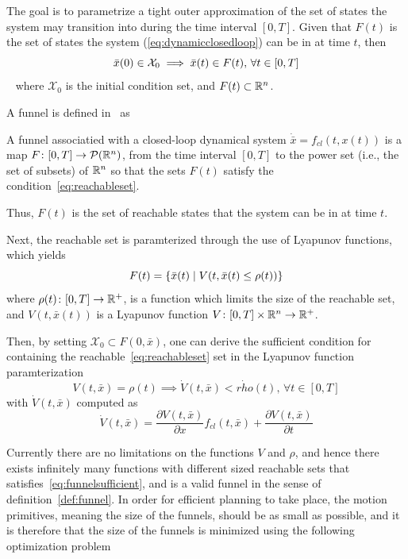 The goal is to parametrize a tight outer approximation of the set of states the
system may transition into during the time interval \([0,T]\). Given that
\(F(t)\) is the set of states the system (\ref{eq:dynamicclosedloop}) can be in
at time \(t\), then
\begin{equation}
  \label{eq:reachableset}
  \bar{x}(0) \in \mathcal{X}_0 \implies \bar{x}(t) \in F(t), \, \forall t \in [0,T]
\end{equation}~\cite{majumdarFunnelLibrariesRealtime2017} 
where \(\mathcal{X}_0\) is the initial condition set, and \(F(t) \subset \mathbb{R}^n\).

A funnel is defined in~\cite{majumdarFunnelLibrariesRealtime2017} as
\begin{definition}
  \label{def:funnel}
  A funnel associatied with a closed-loop dynamical system \(\dot{\bar{x}} =
  f_{cl}(t,x(t))\) is a map \(F \colon [0,T] \rightarrow \mathcal{P}(\mathbb{R}^n)\),
  from the time interval \([0,T]\) to the power set (i.e., the set of subsets)
  of \(\mathbb{R}^n\) so that the sets \(F(t)\) satisfy the
  condition~\ref{eq:reachableset}.
\end{definition}
Thus, \(F(t)\) is the set of reachable states that the system can be in at time
\(t\).

Next, the reachable set is paramterized through the use of Lyapunov functions,
which yields
\begin{equation}
  F(t) = \lbrace\bar{x}(t) \mid V(t, \bar{x}(t) \leq \rho (t))\rbrace
\end{equation}
where \(\rho (t) \colon [0,T] \rightarrow \mathbb{R}^+\), is a function which limits the
size of the reachable set, and \(V(t,\bar{x}(t))\) is a Lyapunov function \(V
\colon [0,T] \times \mathbb{R}^n \rightarrow \mathbb{R}^+\).

Then, by setting \(\mathcal{X}_0 \subset F(0,\bar{x})\), one can derive the
sufficient condition for containing the reachable~\ref{eq:reachableset} set in
the Lyapunov function paramterization
\begin{equation}
  \label{eq:funnelsufficient}
  V(t,\bar{x}) = \rho(t) \implies \dot{V}(t,\bar{x}) < \dot{rho}(t), \, \forall t \in [0,T]
\end{equation}
with \(\dot{V}(t,\bar{x})\) computed as
\begin{equation}
  \dot{V}(t,\bar{x}) = \frac{\partial V(t,\bar{x})}{\partial x} f_{cl}(t,\bar{x}) + \frac{\partial V(t,\bar{x})}{\partial t}
\end{equation}

Currently there are no limitations on the functions \(V\) and \(\rho\), and
hence there exists infinitely many functions with different sized reachable sets
that satisfies~\ref{eq:funnelsufficient}, and is a valid funnel in the sense of
definition~\ref{def:funnel}. In order for efficient planning to take place, the
motion primitives, meaning the size of the funnels, should be as small as
possible, and it is therefore that the size of the funnels is minimized using
the following optimization problem~\cite{majumdarFunnelLibrariesRealtime2017}

